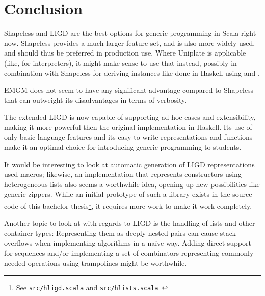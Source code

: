 \chapter{Conclusion}
Shapeless and LIGD are the best options for generic programming in Scala
right now. Shapeless provides a much larger feature set, and is also more
widely used, and should thus be preferred in production use. Where Uniplate
is applicable (like, for interpreters), it might make sense to use that
instead, possibly in combination with Shapeless for deriving instances like
done in Haskell using  and .

EMGM does not seem to have any significant advantage compared to Shapeless that
can outweight its disadvantages in terms of verbosity.

The extended LIGD is now capable of supporting ad-hoc cases and extensibility,
making it more powerful then the original implementation in Haskell. Its use
of only basic language features and its easy-to-write representations and
functions make it an optimal choice for introducing generic programming to
students.

It would be interesting to look at automatic generation of LIGD representations
used macros; likewise, an implementation that represents constructors using
heterogeneous lists also seems a worthwhile idea, opening up new possibilities
like generic zippers. While an initial prototype of such a library exists in
the source code of this bachelor thesis\footnote{See \texttt{src/hligd.scala} and
\texttt{src/hlists.scala}~\cite{src}}, it requires more work to make it work completely.

Another topic to look at with regards to LIGD is the handling of lists and
other container types: Representing them as deeply-nested pairs can cause
stack overflows when implementing algorithms in a naïve way. Adding direct
support for sequences and/or implementing a set of combinators representing
commonly-needed operations using trampolines might be worthwhile.
